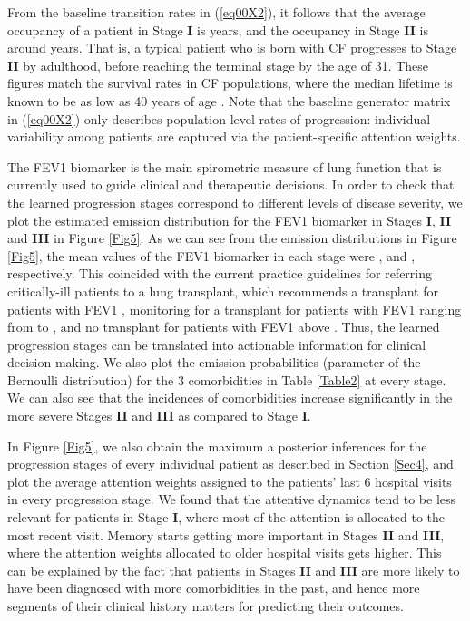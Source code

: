 \documentclass[twoside,11pt]{article}
\begin{document}
From the baseline transition rates in (\ref{eq00X2}), it follows that the average occupancy of a patient in Stage {\bf I} is  years, and the occupancy in Stage {\bf II} is around  years. That is, a typical patient who is born with CF progresses to Stage {\bf II} by adulthood, before reaching the terminal stage by the age of 31. These figures match the survival rates in CF populations, where the median lifetime is known to be as low as 40 years of age \cite{mccarthy2013cf}. Note that the baseline generator matrix in (\ref{eq00X2}) only describes population-level rates of progression: individual variability among patients are captured via the patient-specific attention weights.  

The FEV1  biomarker is the main spirometric measure of lung function that is currently used to guide clinical and therapeutic decisions. In order to check that the learned progression stages correspond to different levels of disease severity, we plot the estimated emission distribution for the FEV1  biomarker in Stages {\bf I}, {\bf II} and {\bf III} in Figure \ref{Fig5}. As we can see from the emission distributions in Figure \ref{Fig5}, the mean values of the FEV1 biomarker in each stage were ,  and , respectively. This coincided with the current practice guidelines for referring critically-ill patients to a lung transplant, which recommends a transplant for patients with FEV1 , monitoring for a transplant for patients with FEV1 ranging from  to , and no transplant for patients with FEV1 above  \cite{braun2011cystic}. Thus, the learned progression stages can be translated into actionable information for clinical decision-making. We also plot the emission probabilities (parameter of the Bernoulli distribution) for the 3 comorbidities in Table \ref{Table2} at every stage. We can also see that the incidences of comorbidities increase significantly in the more severe Stages {\bf II} and {\bf III} as compared to Stage {\bf I}.

In Figure \ref{Fig5}, we also obtain the maximum a posterior inferences for the progression stages of every individual patient as described in Section \ref{Sec4}, and plot the average attention weights assigned to the patients' last 6 hospital visits in every progression stage. We found that the attentive dynamics tend to be less relevant for patients in Stage {\bf I}, where most of the attention is allocated to the most recent visit. Memory starts getting more important in Stages {\bf II} and {\bf III}, where the attention weights allocated to older hospital visits gets higher. This can be explained by the fact that patients in Stages {\bf II} and {\bf III} are more likely to have been diagnosed with more comorbidities in the past, and hence more segments of their clinical history matters for predicting their outcomes.  
 
\end{document}
